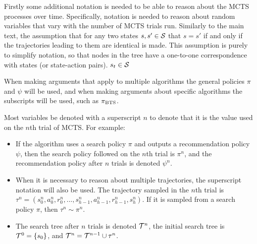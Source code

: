     Firstly some additional notation is needed to be able to reason about the MCTS processes over time. Specifically, notation is needed to reason about random variables that vary with the number of MCTS trials run. Similarly to the main text, the assumption that for any two states $s,s'\in\mathcal{S}$ that $s=s'$ if and only if the trajectories leading to them are identical is made. This assumption is purely to simplify notation, so that nodes in the tree have a one-to-one correspondence with states (or state-action pairs).  $s_t\in\mathcal{S}$ 

    When making arguments that apply to multiple algorithms the general policies $\pi$ and $\psi$ will be used, and when making arguments about specific algorithms the subscripts will be used, such as ${\pi_{{\textnormal{BTS}}}}$.

    Most variables be denoted with a superscript $n$ to denote that it is the value used on the $n$th trial of MCTS. For example:
    \begin{itemize}
        \item 
            If the algorithm uses a search policy $\pi$ and outputs a recommendation policy $\psi$, then the search policy followed on the $n$th trial is $\pi^n$, and the recommendation policy after $n$ trials is denoted $\psi^n$. 
        \item 
            When it is necessary to reason about multiple trajectories, the superscript notation will also be used. The trajectory sampled in the $n$th trial is $\tau^n=(s_0^n,a_0^n,r_0^n,...,s_{h-1}^n,a_{h-1}^n,r_{h-1}^n,s_{h}^n)$. If it is sampled from a search policy $\pi$, then $\tau^n\sim\pi^n$.
        \item 
            The search tree after $n$ trials is denoted $\mathcal{T}^n$, the initial search tree is $\mathcal{T}^0=\{s_0\}$, and $\mathcal{T}^n = \mathcal{T}^{n-1} \cup \tau^n$.
    \end{itemize}

